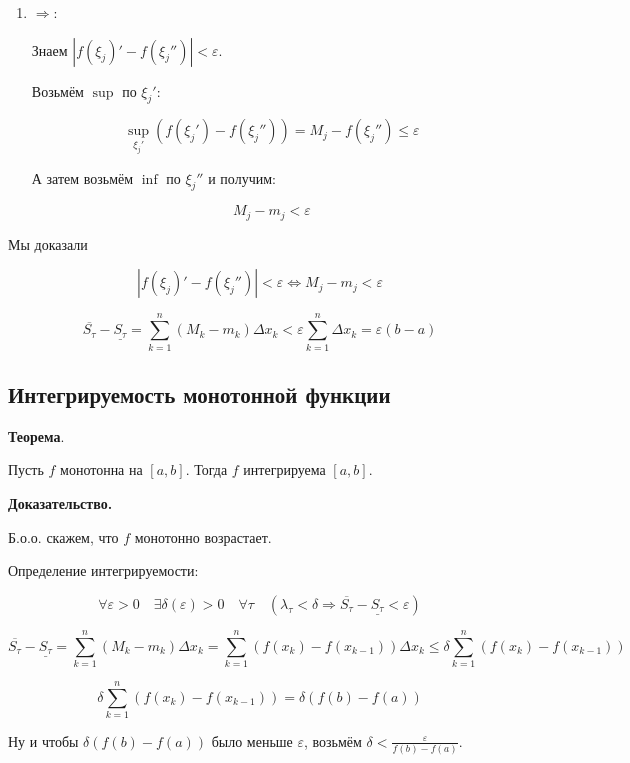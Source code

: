 \documentclass[a4paper]{article}
\begin{document}
\begin{definit}
\begin{hproof}
\begin{enumerate}
\item $\Rightarrow$:

Знаем $|f(\xi_j)' - f(\xi_j'')| < \varepsilon$.

Возьмём $\sup$ по $\xi_j'$:

\[
	\sup_{\xi_j'}(f(\xi_j') - f(\xi_j'')) = M_j - f(\xi_j'') \leq \varepsilon
\]

А затем возьмём $\inf$ по $\xi_j''$ и получим:

\[
M_j - m_j < \varepsilon
\]

\end{enumerate}

Мы доказали 

\[
|f(\xi_j)' - f(\xi_j'')| < \varepsilon \Leftrightarrow M_j - m_j < \varepsilon
\]

\[
\overline{S_\tau} - \underline{S_\tau} = \sum_{k=1}^n (M_k-m_k) \Delta x_k < \varepsilon \sum_{k=1}^n \Delta x_k = \varepsilon (b-a)
\]
\end{hproof}


\end{definit}


\begin{definit}
\hypertarget{p8}{}
\subsection*{Интегрируемость монотонной функции}

\begin{htheorem}\textbf{Теорема}.

Пусть $f$ монотонна на $[a,b]$. Тогда $f$ интегрируема $[a,b]$.
\end{htheorem}

\begin{hproof}\textbf{Доказательство.}

Б.о.о. скажем, что $f$ монотонно возрастает.

Определение интегрируемости:

\[
\forall \varepsilon > 0 \quad \exists \delta(\varepsilon) > 0 \quad \forall \tau \quad (\lambda_\tau < \delta \Rightarrow \overline{S_\tau} - \underline{S_\tau} < \varepsilon)
\]

\[
\overline{S_\tau} - \underline{S_\tau} = \sum_{k=1}^n (M_k-m_k) \Delta x_k = \sum_{k=1}^n (f(x_k) - f(x_{k-1})) \Delta x_k \leq \delta \sum_{k=1}^n (f(x_k) - f(x_{k-1}))
\]

\[
\delta \sum_{k=1}^n (f(x_k) - f(x_{k-1})) = \delta (f(b)-f(a))
\]

Ну и чтобы $\delta (f(b)-f(a))$ было меньше $\varepsilon$, возьмём $\delta < \frac{\varepsilon}{f(b)-f(a)}$.
\end{hproof}
\end{definit}
\end{document}
